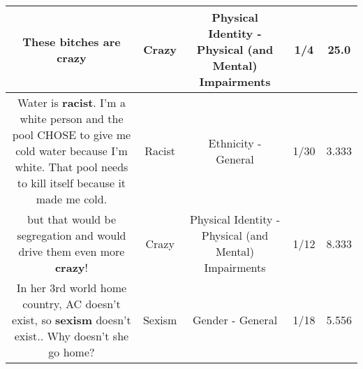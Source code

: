 \documentclass[11pt]{article}
\newlength\mylength
\begin{document}
\begin{center}
\begin{longtable}{|C{.65\mylength}|C{.30\mylength}|C{.12\mylength}|C{.12\mylength}|C{.12\mylength}|}
  \small These bitches are crazy\normalsize   & Crazy & Physical Identity - Physical (and Mental) Impairments & 1/4 & 25.0 \\  \hline
  \small Water is \textbf{racist}. I'm a white person and the pool CHOSE to give me cold water because I'm white. That pool needs to kill itself because it made me cold.\normalsize   & Racist & Ethnicity - General & 1/30 & 3.333 \\  \hline
  \small but that would be segregation and would drive them even more \textbf{crazy}!\normalsize   & Crazy & Physical Identity - Physical (and Mental) Impairments & 1/12 & 8.333 \\  \hline
  \small In her 3rd world home country, AC doesn't exist, so \textbf{sexism} doesn't exist.. Why doesn't she go home?\normalsize   & Sexism & Gender - General & 1/18 & 5.556 \\  \hline

\end{longtable}
\end{center}
\end{document}
